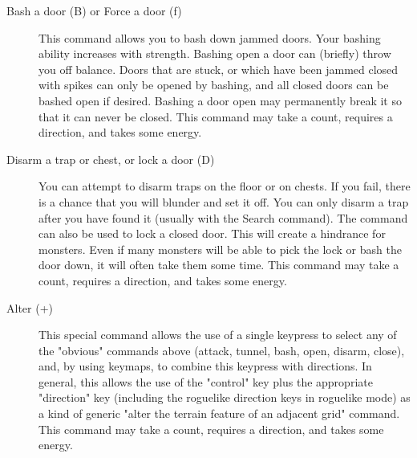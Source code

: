 \begin{description}
\item[Bash a door (B) or Force a door (f)]
  This command allows you to bash down jammed doors. Your bashing ability
  increases with strength. Bashing open a door can (briefly) throw you off
  balance. Doors that are stuck, or which have been jammed closed with
  spikes can only be opened by bashing, and all closed doors can be bashed
  open if desired. Bashing a door open may permanently break it so that it
  can never be closed. This command may take a count, requires a
  direction, and takes some energy.

\item[Disarm a trap or chest, or lock a door (D)]
  You can attempt to disarm traps on the floor or on chests.  If you fail,
  there is a chance that you will blunder and set it off.  You can only
  disarm a trap after you have found it (usually with the Search command).
  The command can also be used to lock a closed door.  This will create a
  hindrance for monsters.  Even if many monsters will be able to pick the
  lock or bash the door down, it will often take them some time.  This
  command may take a count, requires a direction, and takes some energy.
  
\item[Alter (+)]
  This special command allows the use of a single keypress to select any
  of the "obvious" commands above (attack, tunnel, bash, open, disarm,
  close), and, by using keymaps, to combine this keypress with
  directions. In general, this allows the use of the "control" key plus
  the appropriate "direction" key (including the roguelike direction keys
  in roguelike mode) as a kind of generic "alter the terrain feature of an
  adjacent grid" command. This command may take a count, requires a
  direction, and takes some energy.
\end{description}

